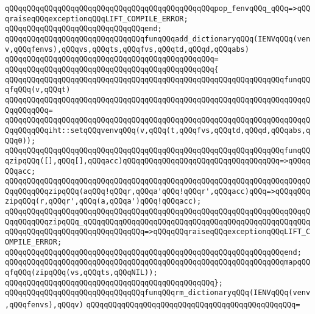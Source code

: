 \verb|qQQqqQQqqQQqqQQqqQQqqQQqqQQqqQQqqQQqqQQqqQQqqQQqpop_fenvqQQq_qQQq=>qQQqraiseqQQqexceptionqQQqLIFT_COMPILE_ERROR;|\newline
\verb|qQQqqQQqqQQqqQQqqQQqqQQqqQQqqQQqend;|\newline
\newline
\verb|qQQqqQQqqQQqqQQqqQQqqQQqqQQqqQQqfunqQQqadd_dictionaryqQQq(IENVqQQq(venv,qQQqfenvs),qQQqvs,qQQqts,qQQqfvs,qQQqtd,qQQqd,qQQqabs)|\newline
\verb|qQQqqQQqqQQqqQQqqQQqqQQqqQQqqQQqqQQqqQQqqQQqqQQq=|\newline
\verb|qQQqqQQqqQQqqQQqqQQqqQQqqQQqqQQqqQQqqQQqqQQqqQQq{|\newline
\verb|qQQqqQQqqQQqqQQqqQQqqQQqqQQqqQQqqQQqqQQqqQQqqQQqqQQqqQQqqQQqqQQqfunqQQqfqQQq(v,qQQqt)|\newline
\verb|qQQqqQQqqQQqqQQqqQQqqQQqqQQqqQQqqQQqqQQqqQQqqQQqqQQqqQQqqQQqqQQqqQQqqQQqqQQqqQQq=|\newline
\verb|qQQqqQQqqQQqqQQqqQQqqQQqqQQqqQQqqQQqqQQqqQQqqQQqqQQqqQQqqQQqqQQqqQQqqQQqqQQqqQQqiht::setqQQqvenvqQQq(v,qQQq(t,qQQqfvs,qQQqtd,qQQqd,qQQqabs,qQQq0));|\newline
\newline
\verb|qQQqqQQqqQQqqQQqqQQqqQQqqQQqqQQqqQQqqQQqqQQqqQQqqQQqqQQqqQQqqQQqfunqQQqzipqQQq([],qQQq[],qQQqacc)qQQqqQQqqQQqqQQqqQQqqQQqqQQqqQQqqQQq=>qQQqqQQqacc;|\newline
\verb|qQQqqQQqqQQqqQQqqQQqqQQqqQQqqQQqqQQqqQQqqQQqqQQqqQQqqQQqqQQqqQQqqQQqqQQqqQQqqQQqzipqQQq(aqQQq!qQQqr,qQQqa'qQQq!qQQqr',qQQqacc)qQQq=>qQQqqQQqzipqQQq(r,qQQqr',qQQq(a,qQQqa')qQQq!qQQqacc);|\newline
\verb|qQQqqQQqqQQqqQQqqQQqqQQqqQQqqQQqqQQqqQQqqQQqqQQqqQQqqQQqqQQqqQQqqQQqqQQqqQQqqQQqzipqQQq_qQQqqQQqqQQqqQQqqQQqqQQqqQQqqQQqqQQqqQQqqQQqqQQqqQQqqQQqqQQqqQQqqQQqqQQqqQQqqQQqqQQq=>qQQqqQQqraiseqQQqexceptionqQQqLIFT_COMPILE_ERROR;|\newline
\verb|qQQqqQQqqQQqqQQqqQQqqQQqqQQqqQQqqQQqqQQqqQQqqQQqqQQqqQQqqQQqqQQqend;|\newline
\newline
\verb|qQQqqQQqqQQqqQQqqQQqqQQqqQQqqQQqqQQqqQQqqQQqqQQqqQQqqQQqqQQqqQQqmapqQQqfqQQq(zipqQQq(vs,qQQqts,qQQqNIL));|\newline
\verb|qQQqqQQqqQQqqQQqqQQqqQQqqQQqqQQqqQQqqQQqqQQqqQQq};|\newline
\newline
\verb|qQQqqQQqqQQqqQQqqQQqqQQqqQQqqQQqfunqQQqrm_dictionaryqQQq(IENVqQQq(venv,qQQqfenvs),qQQqv)|\newline
\verb|qQQqqQQqqQQqqQQqqQQqqQQqqQQqqQQqqQQqqQQqqQQqqQQq=|\newline
